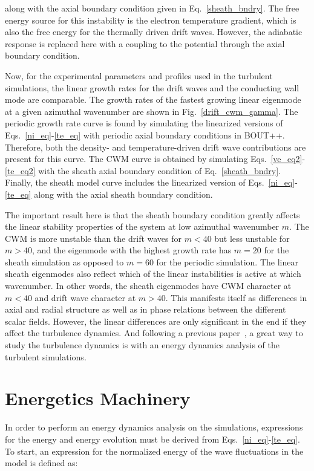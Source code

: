 \documentclass[showpacs,preprintnumbers,amsmath,amssymb,superscriptaddress,aip]{revtex4-1}
\begin{document}
along with the axial boundary condition given in Eq.~\ref{sheath_bndry}. The free energy source for this instability is the electron temperature gradient, which is also the free energy
for the thermally driven drift waves. However, the adiabatic response is replaced here with a coupling to the potential through the axial boundary condition.

Now, for the experimental parameters and profiles used in the turbulent simulations, 
the linear growth rates for the drift waves and the conducting wall mode are comparable. The growth rates of the fastest growing linear eigenmode at a given azimuthal wavenumber
are shown in Fig.~\ref{drift_cwm_gamma}.
The periodic growth rate curve is found by simulating the linearized versions of Eqs.~\ref{ni_eq}-\ref{te_eq} with periodic axial boundary conditions in BOUT++. Therefore, both the density- and
temperature-driven drift wave contributions are present for this curve.
The CWM curve is obtained by simulating Eqs.~\ref{ve_eq2}-\ref{te_eq2} with the sheath axial boundary condition of Eq.~\ref{sheath_bndry}. 
Finally, the sheath model curve includes the linearized version of Eqs.~\ref{ni_eq}-\ref{te_eq} along with the axial sheath boundary condition.

The important result here is that the sheath boundary condition greatly affects the linear stability properties of the system at low azimuthal wavenumber $m$. The CWM is more unstable
than the drift waves for $m<40$ but less unstable for $m>40$, and the eigenmode with the highest growth rate has $m=20$ for the sheath simulation as opposed to $m=60$ for the periodic simulation.
The linear sheath eigenmodes also reflect which of the linear instabilities is active at which wavenumber. In other words, the sheath eigenmodes have CWM character at $m<40$ and drift wave
character at $m>40$. This manifests itself as differences in axial and radial structure as well as in phase relations between the different scalar fields. However, the linear differences
are only significant in the end if they affect the turbulence dynamics. And following a previous paper~\cite{friedman2012b}, a great way to study the turbulence dynamics is with
an energy dynamics analysis of the turbulent simulations.


\section{Energetics Machinery}
\label{sec_energetics_machinery}

In order to perform an energy dynamics analysis on the simulations, expressions for the energy and energy evolution must be derived from Eqs.~\ref{ni_eq}-\ref{te_eq}.
To start, an expression for the normalized energy of the wave fluctuations in the model is defined as:
\end{document}
